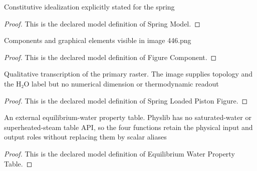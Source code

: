 \begin{definition}
  \label{def:physics:phyx-mini-0446:phyxminiproblems-problemphyxmini0446-springmodel}
  Constitutive idealization explicitly stated for the spring
\end{definition}
\begin{proof}
  This is the declared model definition of Spring Model.
\end{proof}
\begin{definition}
  \label{def:physics:phyx-mini-0446:phyxminiproblems-problemphyxmini0446-figurecomponent}
  Components and graphical elements visible in image 446.png
\end{definition}
\begin{proof}
  This is the declared model definition of Figure Component.
\end{proof}
\begin{definition}
  \label{def:physics:phyx-mini-0446:phyxminiproblems-problemphyxmini0446-springloadedpistonfigure}
  Qualitative transcription of the primary raster. The image supplies topology and the H₂O label but no numerical dimension or thermodynamic readout
\end{definition}
\begin{proof}
  This is the declared model definition of Spring Loaded Piston Figure.
\end{proof}
\begin{definition}
  \label{def:physics:phyx-mini-0446:phyxminiproblems-problemphyxmini0446-equilibriumwaterpropertytable}
  An external equilibrium-water property table. Physlib has no saturated-water or superheated-steam table API, so the four functions retain the physical input and output roles without replacing them by scalar aliases
\end{definition}
\begin{proof}
  This is the declared model definition of Equilibrium Water Property Table.
\end{proof}
